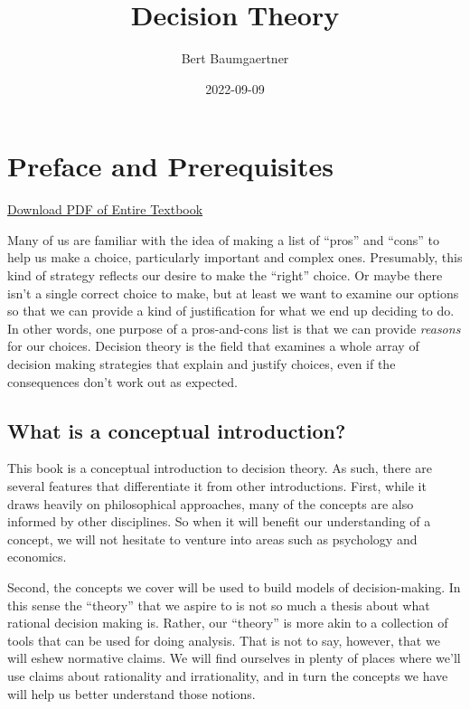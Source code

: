 \documentclass[]{tufte-book}
\title{Decision Theory}
\author{Bert Baumgaertner}
\date{2022-09-09}
\begin{document}
\maketitle



{
\setcounter{tocdepth}{0}
\tableofcontents
}

\hypertarget{preface-and-prerequisites}{%
\chapter*{Preface and Prerequisites}\label{preface-and-prerequisites}}

\href{decisiontheory.pdf}{Download PDF of Entire Textbook}

Many of us are familiar with the idea of making a list of ``pros'' and ``cons'' to help us make a choice, particularly important and complex ones. Presumably, this kind of strategy reflects our desire to make the ``right'' choice. Or maybe there isn't a single correct choice to make, but at least we want to examine our options so that we can provide a kind of justification for what we end up deciding to do. In other words, one purpose of a pros-and-cons list is that we can provide \emph{reasons} for our choices. Decision theory is the field that examines a whole array of decision making strategies that explain and justify choices, even if the consequences don't work out as expected.

\hypertarget{what-is-a-conceptual-introduction}{%
\section{What is a conceptual introduction?}\label{what-is-a-conceptual-introduction}}

This book is a conceptual introduction to decision theory. As such, there are several features that differentiate it from other introductions. First, while it draws heavily on philosophical approaches, many of the concepts are also informed by other disciplines. So when it will benefit our understanding of a concept, we will not hesitate to venture into areas such as psychology and economics.

Second, the concepts we cover will be used to build models of decision-making. In this sense the ``theory'' that we aspire to is not so much a thesis about what rational decision making is. Rather, our ``theory'' is more akin to a collection of tools that can be used for doing analysis. That is not to say, however, that we will eshew normative claims. We will find ourselves in plenty of places where we'll use claims about rationality and irrationality, and in turn the concepts we have will help us better understand those notions.
\end{document}
